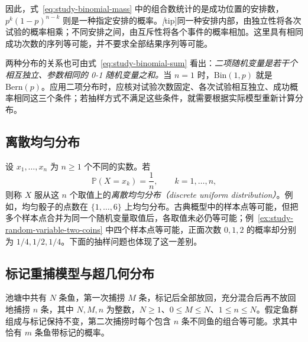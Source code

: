 因此，式~\eqref{eq:study-binomial-mass} 中的组合数统计的是成功位置的安排数，$p^k(1-p)^{n-k}$ 则是一种指定安排的概率。\emph[tip]{同一种安排内部，由独立性将各次试验的概率相乘；不同安排之间，由互斥性将各个事件的概率相加。}这里具有相同成功次数的序列等可能，并不要求全部结果序列等可能。

两种分布的关系也可由式~\eqref{eq:study-binomial-sum} 看出：\emph{二项随机变量是若干个相互独立、参数相同的 0-1 随机变量之和。}当 $n=1$ 时，$\mathrm{Bin}(1,p)$ 就是 $\mathrm{Bern}(p)$。应用二项分布时，应核对试验次数固定、各次试验相互独立、成功概率相同这三个条件；若抽样方式不满足这些条件，就需要根据实际模型重新计算分布。

\subsection{离散均匀分布}
\label{subsec:study-discrete-uniform}

设 $x_1,\ldots,x_n$ 为 $n\ge1$ 个不同的实数。若
\begin{equation}
  \mathbb P(X=x_k)=\frac1n,\qquad k=1,\ldots,n,
  \label{eq:study-discrete-uniform}
\end{equation}
则称 $X$ 服从这 $n$ 个取值上的\emph{离散均匀分布（discrete uniform distribution）}。例如，均匀骰子的点数在 $\{1,\ldots,6\}$ 上均匀分布。古典概型中的样本点等可能，但把多个样本点合并为同一个随机变量取值后，各取值未必仍等可能；例~\ref{ex:study-random-variable-two-coins} 中四个样本点等可能，正面次数 $0,1,2$ 的概率却分别为 $1/4,1/2,1/4$。下面的抽样问题也体现了这一差别。

\subsection{标记重捕模型与超几何分布}
\label{subsec:study-capture-recapture}

\begin{example}
\label{ex:study-capture-recapture}
池塘中共有 $N$ 条鱼，第一次捕捞 $M$ 条，标记后全部放回，充分混合后再不放回地捕捞 $n$ 条，其中 $N,M,n$ 为整数，$N\ge1$、$0\le M\le N$、$1\le n\le N$。假定鱼群组成与标记保持不变，第二次捕捞时每个包含 $n$ 条不同鱼的组合等可能。求其中恰有 $m$ 条鱼带标记的概率。
\end{example}

